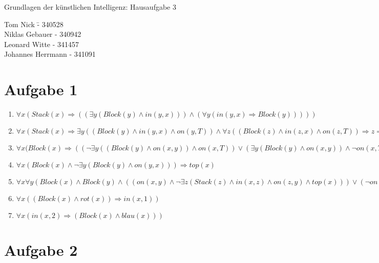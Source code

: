 \documentclass[a4paper,10pt]{article}
\begin{document}
\begin{center}
\Large{Grundlagen der künstlichen Intelligenz: Hausaufgabe 3} \\
\end{center}
\begin{tabbing}
Tom Nick \hspace{2cm}\= - 340528\\
Niklas Gebauer \> - 340942 \\
Leonard Witte \> - 341457 \\
Johannes Herrmann \> - 341091\\
\end{tabbing}

\section*{Aufgabe 1}

\begin{enumerate}[~~a)]
    \item $\forall x (Stack(x) \Rightarrow ((\exists y (Block(y) \land in(y,x))) \land (\forall y(in(y,x) \Rightarrow Block(y)))))$

    \item $\forall x (Stack(x) \Rightarrow \exists y ((Block(y) \land in(y,x) \land on(y,T)) \land \forall z ((Block(z) \land in(z,x) \land on(z,T)) \Rightarrow z=y)))$

    \item $\forall x (Block(x) \Rightarrow ( (\lnot\exists y ((Block(y) \land on(x,y)) \land on(x,T)) \lor (\exists y (Block(y) \land on(x,y)) \land \lnot on(x,T) )))$

    \item $\forall x (Block(x) \land \lnot \exists y (Block(y) \land on(y,x))) \Rightarrow top(x)$

    \item $\forall x \forall y (Block(x) \land Block(y) \land ((on(x,y) \land \lnot\exists z (Stack(z) \land in(x,z) \land on(z,y) \land top(x))) \lor (\lnot on(x,y) \land \exists z (Stack(z) \land in(x,z) \land on(z,y) \land top(x)))) \Rightarrow over(x,y))$

    \item $\forall x ((Block(x) \land rot(x)) \Rightarrow in (x,1))$

    \item $\forall x (in(x,2) \Rightarrow (Block(x) \land blau(x)))$
\end{enumerate}

\section*{Aufgabe 2}
\end{document}

